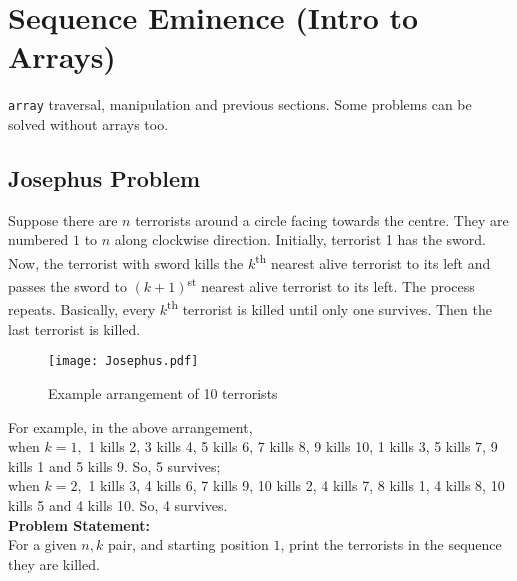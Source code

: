 \section{Sequence Eminence (Intro to Arrays)}{\label{sec:sequences}}
\begin{topics}
\verb!array! traversal, manipulation and previous sections. Some problems can be solved without arrays too.
\end{topics}
\subsection{Josephus Problem}
Suppose there are $n$ terrorists around a circle facing towards the centre. They are numbered $1$ to $n$ along clockwise direction. Initially, terrorist 1 has the sword. Now, the terrorist with sword kills the $k$\textsuperscript{th} nearest alive terrorist to its left and passes the sword to $(k+1)$\textsuperscript{st} nearest alive terrorist to its left. The process repeats. Basically, every $k$\textsuperscript{th} terrorist is killed until only one survives. Then the last terrorist is killed.
\begin{figure}[H]
    \centering
    \texttt{[image: Josephus.pdf]}
    \caption{Example arrangement of 10 terrorists}
    \label{fig:jp}
\end{figure}
\vspace{-1.5em}
For example, in the above arrangement,\\
when $k=1,$ 1 kills 2, 3 kills 4, 5 kills 6, 7 kills 8, 9 kills 10, 1 kills 3, 5 kills 7, 9 kills 1 and 5 kills 9. So, 5 survives;\\%
when $k=2,$ 1 kills 3, 4 kills 6, 7 kills 9, 10 kills 2, 4 kills 7, 8 kills 1, 4 kills 8, 10 kills 5 and 4 kills 10. So, 4 survives.\\%
\textbf{Problem Statement:}\\
For a given $n, k$ pair, and starting position $1$, print the terrorists in the sequence they are killed.
